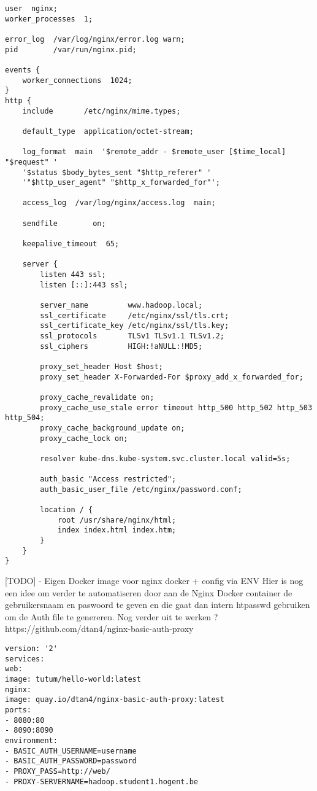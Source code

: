 \begin{lstlisting}
user  nginx;
worker_processes  1;

error_log  /var/log/nginx/error.log warn;
pid        /var/run/nginx.pid;

events {
    worker_connections  1024;
}
http {
    include       /etc/nginx/mime.types;
    
    default_type  application/octet-stream;
    
    log_format  main  '$remote_addr - $remote_user [$time_local] "$request" '
    '$status $body_bytes_sent "$http_referer" '
    '"$http_user_agent" "$http_x_forwarded_for"';
    
    access_log  /var/log/nginx/access.log  main;
    
    sendfile        on;
    
    keepalive_timeout  65;
    
    server {
        listen 443 ssl;
        listen [::]:443 ssl;
        
        server_name         www.hadoop.local;
        ssl_certificate     /etc/nginx/ssl/tls.crt;
        ssl_certificate_key /etc/nginx/ssl/tls.key;
        ssl_protocols       TLSv1 TLSv1.1 TLSv1.2;
        ssl_ciphers         HIGH:!aNULL:!MD5;
        
        proxy_set_header Host $host;
        proxy_set_header X-Forwarded-For $proxy_add_x_forwarded_for;
        
        proxy_cache_revalidate on;
        proxy_cache_use_stale error timeout http_500 http_502 http_503 http_504;
        proxy_cache_background_update on;
        proxy_cache_lock on;
        
        resolver kube-dns.kube-system.svc.cluster.local valid=5s;
        
        auth_basic "Access restricted";
        auth_basic_user_file /etc/nginx/password.conf;
        
        location / {
            root /usr/share/nginx/html;
            index index.html index.htm;
        }
    }
}
\end{lstlisting}

[TODO] - Eigen Docker image voor nginx docker + config via ENV
Hier is nog een idee om verder te automatiseren door aan de Nginx Docker container de gebruikersnaam en paswoord te geven en die gaat dan intern htpasswd gebruiken om de Auth file te genereren. Nog verder uit te werken ?
https://github.com/dtan4/nginx-basic-auth-proxy
\newline
\newline
\begin{lstlisting}
version: '2'
services:
web:
image: tutum/hello-world:latest
nginx:
image: quay.io/dtan4/nginx-basic-auth-proxy:latest
ports:
- 8080:80
- 8090:8090
environment:
- BASIC_AUTH_USERNAME=username
- BASIC_AUTH_PASSWORD=password
- PROXY_PASS=http://web/
- PROXY-SERVERNAME=hadoop.student1.hogent.be

\end{lstlisting}

